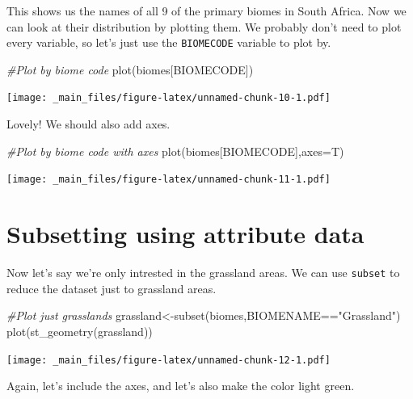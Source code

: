 \documentclass[
]{book}
\newenvironment{Shaded}{\begin{snugshade}}{\end{snugshade}}
\newcommand{\AttributeTok}[1]{\textcolor[rgb]{0.77,0.63,0.00}{#1}}
\newcommand{\CommentTok}[1]{\textcolor[rgb]{0.56,0.35,0.01}{\textit{#1}}}
\newcommand{\FunctionTok}[1]{\textcolor[rgb]{0.00,0.00,0.00}{#1}}
\newcommand{\NormalTok}[1]{#1}
\newcommand{\OtherTok}[1]{\textcolor[rgb]{0.56,0.35,0.01}{#1}}
\newcommand{\SpecialCharTok}[1]{\textcolor[rgb]{0.00,0.00,0.00}{#1}}
\newcommand{\StringTok}[1]{\textcolor[rgb]{0.31,0.60,0.02}{#1}}
\begin{document}
This shows us the names of all 9 of the primary biomes in South Africa. Now we can look at their distribution by plotting them. We probably don't need to plot every variable, so let's just use the \texttt{BIOMECODE} variable to plot by.

\begin{Shaded}
\begin{Highlighting}[]
\CommentTok{\#Plot by biome code}
\FunctionTok{plot}\NormalTok{(biomes[}\StringTok{\textquotesingle{}BIOMECODE\textquotesingle{}}\NormalTok{])}
\end{Highlighting}
\end{Shaded}

\texttt{[image: \_main\_files/figure-latex/unnamed-chunk-10-1.pdf]}

Lovely! We should also add axes.

\begin{Shaded}
\begin{Highlighting}[]
\CommentTok{\#Plot by biome code with axes}
\FunctionTok{plot}\NormalTok{(biomes[}\StringTok{\textquotesingle{}BIOMECODE\textquotesingle{}}\NormalTok{],}\AttributeTok{axes=}\NormalTok{T)}
\end{Highlighting}
\end{Shaded}

\texttt{[image: \_main\_files/figure-latex/unnamed-chunk-11-1.pdf]}

\hypertarget{subsetting-using-attribute-data}{%
\section{Subsetting using attribute data}\label{subsetting-using-attribute-data}}

Now let's say we're only intrested in the grassland areas. We can use \texttt{subset} to reduce the dataset just to grassland areas.

\begin{Shaded}
\begin{Highlighting}[]
\CommentTok{\#Plot just grasslands}
\NormalTok{grassland}\OtherTok{\textless{}{-}}\FunctionTok{subset}\NormalTok{(biomes,BIOMENAME}\SpecialCharTok{==}\StringTok{"Grassland"}\NormalTok{)}
\FunctionTok{plot}\NormalTok{(}\FunctionTok{st\_geometry}\NormalTok{(grassland))}
\end{Highlighting}
\end{Shaded}

\texttt{[image: \_main\_files/figure-latex/unnamed-chunk-12-1.pdf]}

Again, let's include the axes, and let's also make the color light green.
\end{document}
